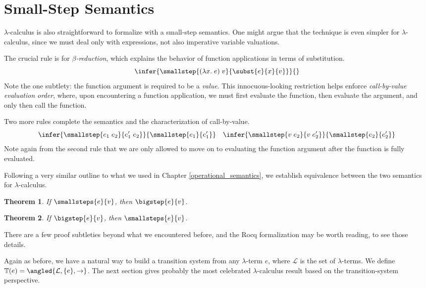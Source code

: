 \documentclass{amsbook}
\newtheorem{theorem}{Theorem}[chapter]
\theoremstyle{definition}
\theoremstyle{remark}
\numberwithin{section}{chapter}
\numberwithin{equation}{chapter}
\begin{document}
\section{Small-Step Semantics}

$\lambda$-calculus is also straightforward to formalize with a small-step semantics.
One might argue that the technique is even simpler for $\lambda$-calculus, since we must deal only with expressions, not also imperative variable valuations.

\encoding
The crucial rule is for \emph{$\beta$-reduction}, which explains the behavior of function applications in terms of substitution.
$$\infer{\smallstep{(\lambda x. \; e) \; v}{\subst{e}{x}{v}}}{}$$
Note the one subtlety: the function argument is required to be a \emph{value}.
This innocuous-looking restriction helps enforce \emph{call-by-value evaluation order}, where, upon encountering a function application, we must first evaluate the function, then evaluate the argument, and only then call the function.

Two more rules complete the semantics and the characterization of call-by-value.
$$\infer{\smallstep{e_1 \; e_2}{e'_1 \; e_2}}{
  \smallstep{e_1}{e'_1}
}
\quad \infer{\smallstep{v \; e_2}{v \; e'_2}}{
  \smallstep{e_2}{e'_2}
}$$
Note again from the second rule that we are only allowed to move on to evaluating the function argument after the function is fully evaluated.

Following a very similar outline to what we used in Chapter \ref{operational_semantics}, we establish equivalence between the two semantics for $\lambda$-calculus.

\begin{theorem}
  If $\smallsteps{e}{v}$, then $\bigstep{e}{v}$.
\end{theorem}

\begin{theorem}
  If $\bigstep{e}{v}$, then $\smallsteps{e}{v}$.
\end{theorem}

There are a few proof subtleties beyond what we encountered before, and the Rocq formalization may be worth reading, to see those details.

Again as before, we have a natural way to build a transition system from any $\lambda$-term $e$, where $\mathcal L$ is the set of $\lambda$-terms.
We define $\mathbb T(e) = \angled{\mathcal L, \{e\}, \to}$.
The next section gives probably the most celebrated $\lambda$-calculus result based on the transition-system perspective.
\end{document}
